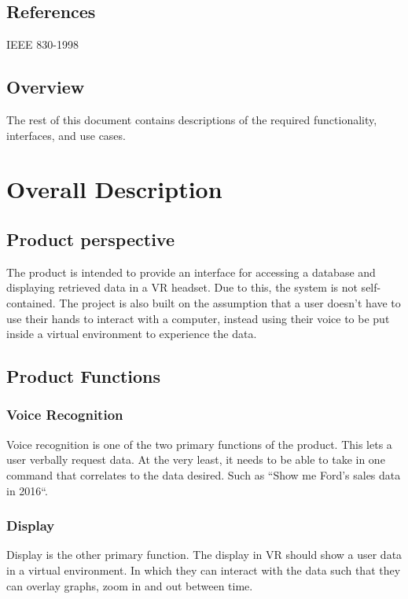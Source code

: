\documentclass[onecolumn, draftclsnofoot,10pt, compsoc]{IEEEtran}
\begin{document}
    \subsection{References}
        IEEE 830-1998
    
    \subsection{Overview}
        The rest of this document contains descriptions of the required functionality, interfaces, and use cases.
    \section{Overall Description}
    
    \subsection{Product perspective}
        The product is intended to provide an interface for accessing a database and displaying retrieved data in a VR headset. Due to this, the system is not self-contained. The project is also built on the assumption that a user doesn’t have to use their hands to interact with a computer, instead using their voice to be put inside a virtual environment to experience the data.
    
    \subsection{Product Functions}
    
        \subsubsection{Voice Recognition}
            Voice recognition is one of the two primary functions of the product. This lets a user verbally request data. At the very least, it needs to be able to take in one command that correlates to the data desired. Such as ``Show me Ford’s sales data in 2016``. 
    
        \subsubsection{Display}
            Display is the other primary function. The display in VR should show a user data in a virtual environment. In which they can interact with the data such that they can overlay graphs, zoom in and out between time. 
    
\end{document}
